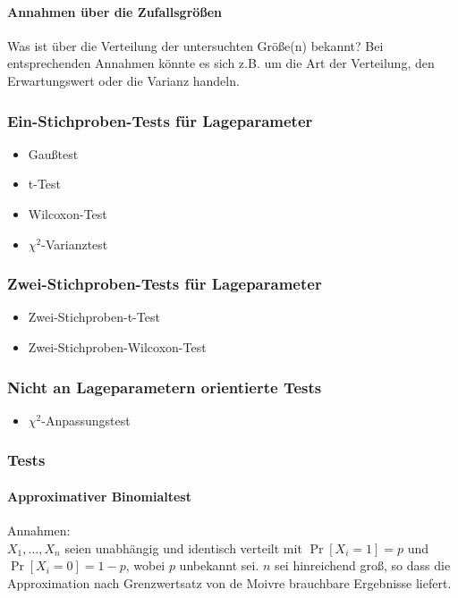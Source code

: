 \documentclass[a4paper,9pt]{extarticle}
\begin{document}
\paragraph*{Annahmen über die Zufallsgrößen}
Was ist über die Verteilung der untersuchten Größe(n) bekannt? Bei entsprechenden Annahmen könnte es sich z.B. um die Art der Verteilung, den Erwartungswert oder die Varianz handeln.

\subsubsection*{Ein-Stichproben-Tests für Lageparameter}
\begin{itemize}
	\item Gaußtest
	\item t-Test
	\item Wilcoxon-Test
	\item $\chi^2$-Varianztest
\end{itemize}

\subsubsection*{Zwei-Stichproben-Tests für Lageparameter}
\begin{itemize}
	\item Zwei-Stichproben-t-Test
	\item Zwei-Stichproben-Wilcoxon-Test
\end{itemize}

\subsubsection*{Nicht an Lageparametern orientierte Tests}
\begin{itemize}
	\item $\chi^2$-Anpassungstest
\end{itemize}

\subsubsection*{Tests}
\paragraph*{Approximativer Binomialtest}
Annahmen: \\
$X_1, \dots, X_n$ seien unabhängig und identisch verteilt mit $\Pr[X_i = 1] = p$ und $\Pr[X_i = 0] = 1 -p$, wobei $p$ unbekannt sei. $n$ sei hinreichend groß, so dass die Approximation nach Grenzwertsatz von de Moivre brauchbare Ergebnisse liefert. \\
\end{document}

